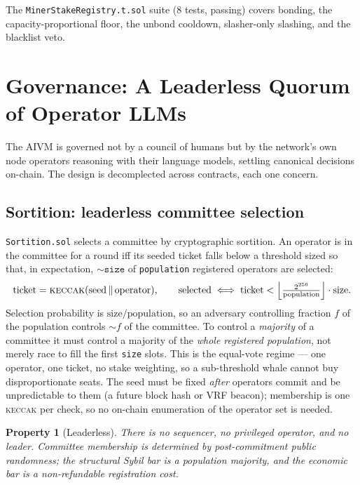 \documentclass[11pt,a4paper]{article}
\newtheorem{property}{Property}
\begin{document}
The \texttt{MinerStakeRegistry.t.sol} suite (8 tests, passing) covers bonding, the capacity-proportional floor, the unbond cooldown, slasher-only slashing, and the blacklist veto.

\section{Governance: A Leaderless Quorum of Operator LLMs}\label{sec:governance}

The AIVM is governed not by a council of humans but by the network's own node operators reasoning with their language models, settling canonical decisions on-chain. The design is decomplected across contracts, each one concern.

\subsection{Sortition: leaderless committee selection}\label{sec:sortition}

\texttt{Sortition.sol} selects a committee by cryptographic sortition. An operator is in the committee for a round iff its seeded ticket falls below a threshold sized so that, in expectation, $\sim\!\texttt{size}$ of \texttt{population} registered operators are selected:
\[
  \text{ticket} = \textsc{keccak}(\text{seed} \,\|\, \text{operator}), \qquad \text{selected} \iff \text{ticket} < \Big\lfloor \tfrac{2^{256}}{\text{population}} \Big\rfloor \cdot \text{size}.
\]
Selection probability is $\text{size}/\text{population}$, so an adversary controlling fraction $f$ of the population controls $\sim\! f$ of the committee. To control a \emph{majority} of a committee it must control a majority of the \emph{whole registered population}, not merely race to fill the first \texttt{size} slots. This is the equal-vote regime --- one operator, one ticket, no stake weighting, so a sub-threshold whale cannot buy disproportionate seats. The seed must be fixed \emph{after} operators commit and be unpredictable to them (a future block hash or VRF beacon); membership is one \textsc{keccak} per check, so no on-chain enumeration of the operator set is needed.

\begin{property}[Leaderless]\label{prop:leaderless}
There is no sequencer, no privileged operator, and no leader. Committee membership is determined by post-commitment public randomness; the structural Sybil bar is a population majority, and the economic bar is a non-refundable registration cost.
\end{property}
\end{document}
